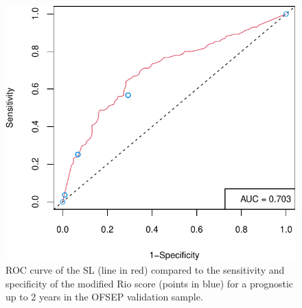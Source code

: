 \begin{figure}
\centering
\includegraphics{RJ-2024-037_files/figure-latex/rocfig2-1.pdf}
\caption{\label{fig:rocfig2}ROC curve of the SL (line in red) compared to the sensitivity and specificity of the modified Rio score (points in blue) for a prognostic up to 2 years in the OFSEP validation sample.}
\end{figure}

\clearpage



\address{%
Camille Sabathe\\
Nantes University, INSERM U1246 SPHERE, France\\%
22, Bd Benoni Goullin, F-44200 Nantes\\
%
%
\textit{ORCiD: \href{https://orcid.org/0000-0001-9353-691X}{0000-0001-9353-691X}}\\%
\href{mailto:camille.sabathe@univ-nantes.fr}{\nolinkurl{camille.sabathe@univ-nantes.fr}}%
}

\address{%
Yohann Foucher\\
University and Hospital of Poitiers, CIC INSERM 1402\\%
2, rue de la Miletrie, F-86000 Poitiers, France\\
%
%
\textit{ORCiD: \href{https://orcid.org/0000-0003-0330-7457}{0000-0003-0330-7457}}\\%
\href{mailto:yohann.foucher@univ-poitiers.fr}{\nolinkurl{yohann.foucher@univ-poitiers.fr}}%
}
